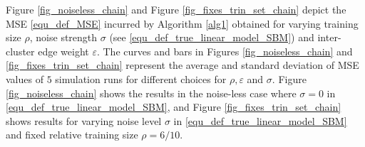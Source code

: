 \documentclass[lettersize,journal]{IEEEtran}
\begin{document}
Figure \ref{fig_noiseless_chain} and Figure \ref{fig_fixes_trin_set_chain} depict the MSE \eqref{equ_def_MSE} incurred 
by Algorithm \ref{alg1} obtained for varying training size $\rho$, noise strength $\sigma$ (see \eqref{equ_def_true_linear_model_SBM}) 
and inter-cluster edge weight $\varepsilon$. The curves and bars in Figures \ref{fig_noiseless_chain} and \ref{fig_fixes_trin_set_chain} 
represent the average and standard deviation of MSE values of $5$ simulation runs for different choices for $\rho, \varepsilon$ and $\sigma$. 
Figure \ref{fig_noiseless_chain} shows the results in the noise-less case where $\sigma=0$ in \eqref{equ_def_true_linear_model_SBM}, 
and Figure \ref{fig_fixes_trin_set_chain} shows results for varying noise level $\sigma$ in \eqref{equ_def_true_linear_model_SBM} 
and fixed relative training size $\rho=6/10$. 
\end{document}

